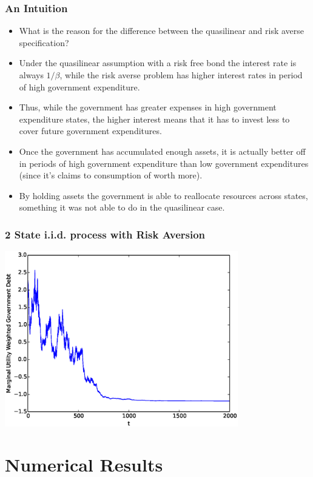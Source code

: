 \documentclass{beamer}
\begin{document}
\begin{frame}
	\frametitle{An Intuition}
	\begin{itemize}
		\item  What is the reason for the difference between the quasilinear and risk averse specification?
		\item  Under the quasilinear assumption with a risk free bond the interest rate is always $1/\beta$, while the risk averse problem has higher interest rates in period of high government expenditure.
		\item  Thus, while the government has greater expenses in high government expenditure states, the higher interest means that it has to invest less to cover future government expenditures.
		\item  Once the government has accumulated enough assets, it is actually better off in periods of high government expenditure than low government expenditures (since it's claims to consumption of worth more).
		\item  By holding assets the government is able to reallocate resources across states, something it was not able to do in the quasilinear case.
	\end{itemize}
\end{frame}

\begin{frame}
	\frametitle{2 State i.i.d. process with Risk Aversion}
	\begin{center}
	\includegraphics[width=4in]{Images/2stateiid.eps}
	\end{center}
\end{frame}
  
\section{Numerical Results}
\end{document}
